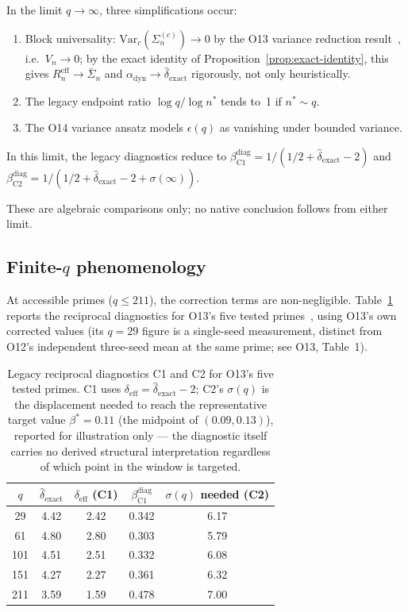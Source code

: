 \documentclass[11pt,a4paper]{article}
\newcommand{\Sn}{\bar{\Sigma}_n}
\newcommand{\dexact}{\hat{\delta}_{\mathrm{exact}}}
\newcommand{\deff}{\delta_{\mathrm{eff}}}
\newcommand{\Reff}{R_n^{\mathrm{eff}}}
\newcommand{\bstar}{\beta^{*}}
\begin{document}
In the limit $q \to \infty$, three simplifications occur:
\begin{enumerate}[label=(\alph*)]
\item Block universality: $\mathrm{Var}_c(\Sigma_n^{(c)}) \to 0$
by the O13 variance reduction result~\cite{Beau2026a17}, i.e.\ $V_n\to0$; by
the exact identity of Proposition~\ref{prop:exact-identity}, this gives
$\Reff \to \Sn$ and $\alpha_{\mathrm{dyn}} \to \dexact$ rigorously, not only
heuristically.
\item The legacy endpoint ratio $\log q / \log n^{*}$ tends to~1 if $n^{*}\sim q$.
\item The O14 variance ansatz models $\epsilon(q)$ as vanishing under bounded variance.
\end{enumerate}
In this limit, the legacy diagnostics reduce to
$\beta_{\mathrm{C1}}^{\mathrm{diag}}=1/(1/2+\dexact-2)$ and
$\beta_{\mathrm{C2}}^{\mathrm{diag}}
=1/(1/2+\dexact-2+\sigma(\infty))$.

These are algebraic comparisons only; no native conclusion follows from either limit.

\subsection{Finite-\texorpdfstring{$q$}{q} phenomenology}

At accessible primes ($q \leq 211$), the correction terms are
non-negligible.
Table~\ref{tab:scenarios} reports the reciprocal diagnostics for O13's five
tested primes~\cite{Beau2026a17}, using O13's own corrected values (its
$q=29$ figure is a single-seed measurement, distinct from O12's independent
three-seed mean at the same prime; see O13, Table~1).

\begin{table}[ht]
\centering
\caption{Legacy reciprocal diagnostics C1 and C2 for O13's five tested primes.
C1 uses $\deff = \dexact - 2$; C2's $\sigma(q)$ is the displacement needed to
reach the representative target value $\bstar=0.11$ (the midpoint of
$(0.09,0.13)$), reported for illustration only — the diagnostic itself
carries no derived structural interpretation regardless of which point in
the window is targeted.}
\label{tab:scenarios}
\begin{tabular}{ccccc}
\toprule
$q$ & $\dexact$ & $\deff$ (C1) & $\beta_{\mathrm{C1}}^{\mathrm{diag}}$
& $\sigma(q)$ needed (C2) \\
\midrule
29 & 4.42 & 2.42 & 0.342 & 6.17 \\
61 & 4.80 & 2.80 & 0.303 & 5.79 \\
101 & 4.51 & 2.51 & 0.332 & 6.08 \\
151 & 4.27 & 2.27 & 0.361 & 6.32 \\
211 & 3.59 & 1.59 & 0.478 & 7.00 \\
\bottomrule
\end{tabular}
\end{table}
\end{document}

